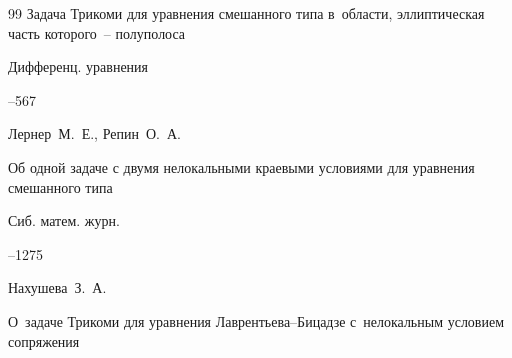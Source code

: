 \begin{thebibliography}{99}
\paper Задача Трикоми для уравнения смешанного типа в~области, эллиптическая часть которого~-- полуполоса

\jour Дифференц. уравнения




--567












\by Лернер~М.~Е., Репин~О.~А.

\paper Об одной задаче с двумя нелокальными краевыми условиями для уравнения смешанного типа

\jour Сиб. матем. журн.




--1275















\by Нахушева~З.~А.

\paper О~задаче Трикоми для уравнения Лаврентьева--Бицадзе с~нелокальным условием сопряжения


\end{thebibliography}
